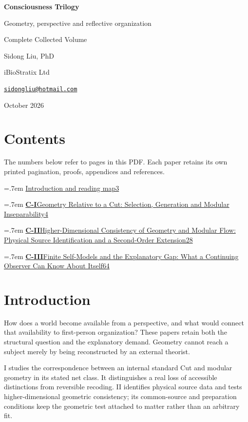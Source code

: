 \documentclass[11pt,a4paper]{article}
\newcommand{\volumeentry}[3]{\par\begingroup\parskip=.7em
  \noindent\href{Consciousness_Trilogy_Complete_Collection.pdf\#page=#3}{\textbf{#1}\quad #2\nobreak\dotfill\nobreak\mbox{#3}}\par\endgroup}
\begin{document}
\begin{titlepage}
\centering
\vspace*{1.6cm}
{\Huge\bfseries Consciousness Trilogy\par}
\vspace{1cm}
{\Large Geometry, perspective and reflective organization\par}
\vfill
{\Large Complete Collected Volume\par}
\vspace{1.6cm}
{\Large Sidong Liu, PhD\par}
\vspace{.3cm}
{iBioStratix Ltd\par}
\href{mailto:sidongliu@hotmail.com}{\texttt{sidongliu@hotmail.com}}\par
\vspace{1cm}
{\large October 2026\par}
\end{titlepage}
\setcounter{page}{2}
\section*{Contents}
The numbers below refer to pages in this PDF. Each paper retains its own printed pagination, proofs, appendices and references.
\volumeentry{}{Introduction and reading map}{3}
\volumeentry{C-I}{Geometry Relative to a Cut: Selection, Generation and Modular Inseparability}{4}
\volumeentry{C-II}{Higher-Dimensional Consistency of Geometry and Modular Flow: Physical Source Identification and a Second-Order Extension}{28}
\volumeentry{C-III}{Finite Self-Models and the Explanatory Gap: What a Continuing Observer Can Know About Itself}{64}
\clearpage
\section*{Introduction}\label{collection:intro}
How does a world become available from a perspective, and what would connect that availability to first-person organization? These papers retain both the structural question and the explanatory demand. Geometry cannot reach a subject merely by being reconstructed by an external theorist.

I studies the correspondence between an internal standard Cut and modular geometry in its stated net class. It distinguishes a real loss of accessible distinctions from reversible recoding. II identifies physical source data and tests higher-dimensional geometric consistency; its common-source and preparation conditions keep the geometric test attached to matter rather than an arbitrary fit.
\end{document}
